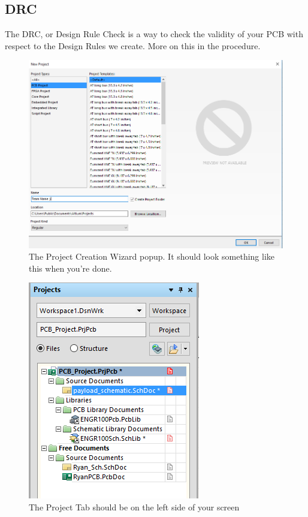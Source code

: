 \documentclass[12pt]{article}
\begin{document}
\subsection*{DRC}
    The DRC, or Design Rule Check is a way to check the validity of your PCB with respect to the Design Rules we create. More on this in the procedure.\\

    \begin{figure}[h]
    \begin{center}
    \includegraphics[scale=0.4]{Figures/Altium_newproj.PNG}
    \caption{The Project Creation Wizard popup. It should look something like this when you're done.}
    \end{center}
    \end{figure}
    
    \begin{figure}[h]
    \begin{center}
    \includegraphics[scale=0.5]{Figures/Altium_projtab.PNG}
    \caption{The Project Tab should be on the left side of your screen}
    \end{center}
    \end{figure}
    
\end{document}
